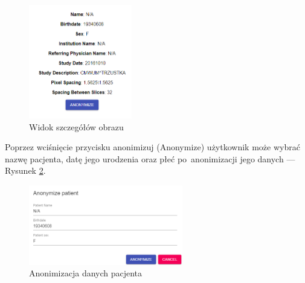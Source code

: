 \documentclass[a4paper,11pt,twoside,openright]{report}
\theoremstyle{definition}
\begin{document}
\begin{enumerate}
\begin{figure}[h!]
	\center
	\includegraphics[width=0.4\textwidth]{18}
	\caption{Widok szczegółów obrazu}
    	\label{fig:18}
\end{figure}

Poprzez wciśnięcie przycisku anonimizuj (Anonymize) użytkownik może wybrać nazwę
pacjenta, datę jego urodzenia oraz płeć po~anonimizacji jego danych --- Rysunek \ref{fig:19}.

\begin{figure}[h!]
	\center
	\includegraphics[width=0.6\textwidth]{19}
	\caption{Anonimizacja danych pacjenta}
    	\label{fig:19}
\end{figure}



\end{enumerate}
\end{document}
